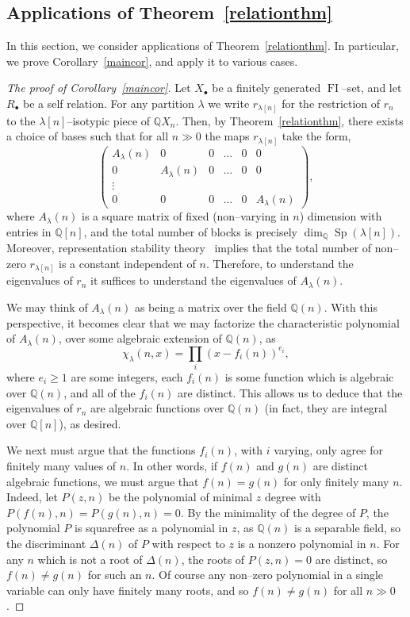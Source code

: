 \documentclass[10pt]{amsart}
\DeclareMathOperator{\FI}{FI}
\DeclareMathOperator{\Sp}{Sp}
\newcommand{\Q}{\mathbb{Q}}
\newcommand{\dt}{\bullet}
\theoremstyle{definition}
\begin{document}
\subsection{Applications of Theorem~\ref{relationthm}}
\label{mainapp}
In this section, we consider applications of Theorem~\ref{relationthm}. In particular, we prove Corollary~\ref{maincor}, and apply it to various cases.

\begin{proof}[The proof of Corollary~\ref{maincor}]
Let $X_\dt$ be a finitely generated $\FI$--set, and let $R_\dt$ be a self relation. For any partition $\lambda$ we write $r_{\lambda[n]}$ for the restriction of $r_n$ to the $\lambda[n]$--isotypic piece of $\Q X_n$. Then, by Theorem~\ref{relationthm}, there exists a choice of bases such that for all $n \gg 0$ the maps $r_{\lambda[n]}$ take the form,
\[
\begin{pmatrix}
A_\lambda(n)& 0& 0 &\dots & 0& 0\\
0 & A_\lambda(n) & 0 &\dots & 0 &0\\
\vdots\\
0 & 0 & 0 &\dots& 0 & A_{\lambda}(n)
\end{pmatrix},
\]
where $A_{\lambda}(n)$ is a square matrix of fixed (non--varying in $n$) dimension with entries in $\Q[n]$, and the total number of blocks is precisely $\dim_\Q \Sp(\lambda[n])$. Moreover, representation stability theory~\cite{CEF} implies that the total number of non--zero $r_{\lambda[n]}$ is a constant independent of $n$. Therefore, to understand the eigenvalues of $r_{n}$ it suffices to understand the eigenvalues of $A_\lambda(n)$.

We may think of $A_\lambda(n)$ as being a matrix over the field $\Q(n)$. With this perspective, it becomes clear that we may factorize the characteristic polynomial of $A_\lambda(n)$, over some algebraic extension of $\Q(n)$, as
\[
\chi_{\lambda}(n,x) = \prod_i (x-f_i(n))^{e_i},
\]
where $e_i \geq 1$ are some integers, each $f_i(n)$ is some function which is algebraic over $\Q(n)$, and all of the $f_i(n)$ are distinct. This allows us to deduce that the eigenvalues of $r_n$ are algebraic functions over $\Q(n)$ (in fact, they are integral over $\Q[n]$), as desired.

We next must argue that the functions $f_i(n)$, with $i$ varying, only agree for finitely many values of $n$. In other words, if $f(n)$ and $g(n)$ are distinct algebraic functions, we must argue that $f(n)=g(n)$ for only finitely many $n$. Indeed, let $P(z,n)$ be the polynomial of minimal $z$ degree with $P(f(n), n) = P(g(n), n) = 0$. 
By the minimality of the degree of $P$, the polynomial $P$ is squarefree as a polynomial in $z$, as $\Q(n)$ is a separable field, so the discriminant $\Delta(n)$ of $P$ with respect to $z$ is a nonzero polynomial in $n$. For any $n$ which is not a root of $\Delta(n)$, the roots of $P(z,n)=0$ are distinct, so $f(n) \neq g(n)$ for such an $n$. Of course any non--zero polynomial in a single variable can only have finitely many roots, and so $f(n) \neq g(n)$ for all $n \gg 0$.


\end{proof}
\end{document}
